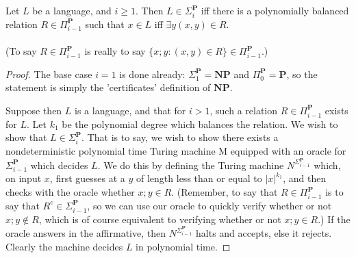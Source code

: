 \begin{lemma}
    Let $L$ be a language, and $i \geq 1$. Then $L \in \Sigma_i^{\textbf{P}}$ iff there is a polynomially balanced relation $R \in \Pi_{i-1}^{\textbf{P}}$ such that $x \in L$ iff $\exists y (x,y) \in R$. \\
    \\
    (To say $R \in \Pi_{i-1}^{\textbf{P}}$ is really to say $\{x;y: (x,y) \in R\} \in \Pi_{i-1}^{\textbf{P}}$.)
\end{lemma}
\begin{proof}
    The base case $i=1$ is done already: $\Sigma_1^{\textbf{P}} = \textbf{NP}$ and $\Pi_0^{\textbf{P}} = \textbf{P}$, so the statement is simply the 'certificates' definition of $\textbf{NP}$.
    \par Suppose then $L$ is a language, and that for $i > 1$, such a relation $R \in \Pi_{i-1}^{\textbf{P}}$ exists for $L$. Let $k_1$ be the polynomial degree which balances the relation. We wish to show that $L \in \Sigma_i^{\textbf{P}}$. That is to say, we wish to show there exists a nondeterministic polynomial time Turing machine M equipped with an oracle for $\Sigma_{i-1}^{\textbf{P}}$ which decides $L$. We do this by defining the Turing machine $N^{\Sigma_{i-1}^{\textbf{P}}}$ which, on input $x$, first guesses at a $y$ of length less than or equal to $|x|^{k_1}$, and then checks with the oracle whether $x;y \in R$. (Remember, to say that $R \in \Pi_{i-1}^{\textbf{P}}$ is to say that $R^c \in \Sigma_{i-1}^{\textbf{P}}$, so we can use our oracle to quickly verify whether or not $x;y \notin R$, which is of course equivalent to verifying whether or not $x;y \in R$.) If the oracle answers in the affirmative, then $N^{\Sigma_{i-1}^{\textbf{P}}}$ halts and accepts, else it rejects. Clearly the machine decides $L$ in polynomial time.

\end{proof}

